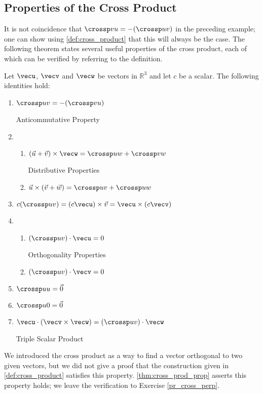 \subsection*{Properties of the Cross Product}

It is not coincidence that $\crossp vu = -(\crossp uv)$ in the preceding example; one can show using \autoref{def:cross_product} that this will always be the case. The following theorem states several useful properties of the cross product, each of which can be verified by referring to the definition.

\setboxwidth{15pt}
{Let $\vecu$, $\vecv$ and $\vecw$ be vectors in $\mathbb{R}^3$ and let $c$ be a scalar. The following identities hold:
\begin{enumerate}
	\item \parbox{167pt}{$\crossp uv = -(\crossp vu)$} Anticommutative Property
	\item	\begin{enumerate}
		\item \parbox{145pt}{$(\vec u+\vec v)\times \vecw = \crossp uw+\crossp vw$} Distributive Properties
		\item	$\vec u \times (\vec v+\vec w) = \crossp uv+\crossp uw$
	\end{enumerate}
	\item		$c(\crossp uv) = (c\vecu) \times \vec v = \vecu \times (c\vecv)$
	\item		\begin{enumerate}
		\item \parbox{145pt}{$(\crossp uv)\cdot \vecu = 0$} Orthogonality Properties
		\item	$(\crossp uv)\cdot \vecv = 0$
	\end{enumerate}
	\item		$\crossp uu = \vec 0$
	\item		$\crossp u0 = \vec 0$
	\item		\parbox{167pt}{$\vecu \cdot (\vecv\times\vecw) = (\crossp uv)\cdot \vecw$} Triple Scalar Product
\end{enumerate}}

We introduced the cross product as a way to find a vector orthogonal to two given vectors, but we did not give a proof that the construction given in \autoref{def:cross_product} satisfies this property. \autoref{thm:cross_prod_prop} asserts this property holds; we leave the verification to Exercise \ref{pr_cross_perp}.

